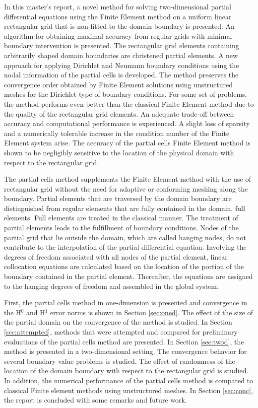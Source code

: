 \documentclass[12pt,twoside]{article}
\begin{document}
\par In this master's report, a novel method for solving two-dimensional partial differential equations using the Finite Element method on a uniform linear rectangular grid that is non-fitted to the domain boundary is presented. An algorithm for obtaining maximal accuracy from regular grids with minimal boundary intervention is presented. The rectangular grid elements containing arbitrarily shaped domain boundaries are christened partial elements. A new approach for applying Dirichlet and Neumann boundary conditions using the nodal information of the partial cells is developed. The method preserves the convergence order obtained by Finite Element solutions using unstructured meshes for the Dirichlet type of boundary conditions.  For some set of problems, the method performs even better than the classical Finite Element method due to the quality of the rectangular grid elements.  An adequate trade-off between accuracy and computational performance is experienced.  A slight loss of sparsity and a numerically tolerable increase in the condition number of the Finite Element system arise. The accuracy of the partial cells Finite Element method is shown to be negligibly sensitive to the location of the physical domain with respect to the rectangular grid. 
\par The partial cells method supplements the Finite Element method with the use of rectangular grid without the need for adaptive or conforming meshing along the boundary. Partial elements that are traversed by the domain boundary are distinguished from regular elements that are fully contained in the domain, full elements. Full elements are treated in the classical manner. The treatment of partial elements  leads to the fulfillment of boundary conditions. Nodes of the partial grid that lie outside the domain, which are called hanging nodes, do not contribute to the interpolation of the partial differential equation. Involving the degrees of freedom associated with all nodes of the partial element, linear collocation equations are calculated based on the location of the portion of the boundary contained in the partial element. Thereafter, the equations are assigned to the hanging degrees of freedom and assembled in the global system. 
\par First, the partial cells method in one-dimension is presented and convergence in the H$^0$ and  H$^1$ error norms is shown in Section \ref{sec:oned}. The effect of the size of the partial domain on the convergence of the method is studied. In Section \ref{sec:attempted}, methods  that were attempted and compared for preliminary evaluations of the partial cells method are presented. In Section \ref{sec:twod},  the method is presented in a two-dimensional setting. The convergence behavior for several boundary value problems is studied. The effect of randomness of the location of the domain boundary with respect to the rectangular grid is studied. In addition, the numerical performance of the partial cells method is compared to classical Finite element methods using unstructured meshes.  In Section \ref{sec:conc}, the report is concluded with some remarks and future work. 
\end{document}
